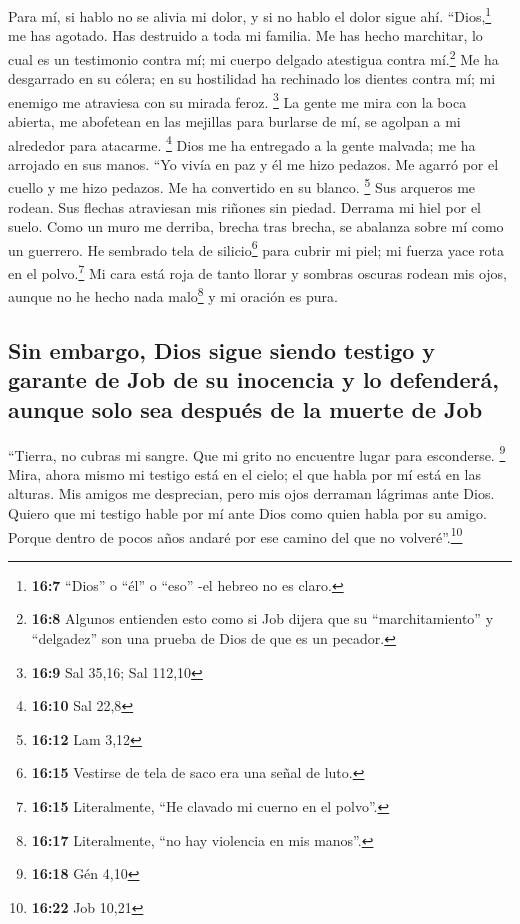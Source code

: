  Para mí, si hablo no se alivia mi dolor, y si no hablo el
dolor sigue ahí.  ``Dios,\footnote{\textbf{16:7} ``Dios''
  o ``él'' o ``eso'' -el hebreo no es claro.} me has agotado. Has
destruido a toda mi familia.  Me has hecho marchitar, lo
cual es un testimonio contra mí; mi cuerpo delgado atestigua contra
mí.\footnote{\textbf{16:8} Algunos entienden esto como si Job dijera que
  su ``marchitamiento'' y ``delgadez'' son una prueba de Dios de que es
  un pecador.}  Me ha desgarrado en su cólera; en su
hostilidad ha rechinado los dientes contra mí; mi enemigo me atraviesa
con su mirada feroz. \footnote{\textbf{16:9} Sal 35,16; Sal 112,10}
 La gente me mira con la boca abierta, me abofetean en
las mejillas para burlarse de mí, se agolpan a mi alrededor para
atacarme. \footnote{\textbf{16:10} Sal 22,8}  Dios me ha
entregado a la gente malvada; me ha arrojado en sus manos.
 ``Yo vivía en paz y él me hizo pedazos. Me agarró por el
cuello y me hizo pedazos. Me ha convertido en su blanco. \footnote{\textbf{16:12}
  Lam 3,12}  Sus arqueros me rodean. Sus flechas
atraviesan mis riñones sin piedad. Derrama mi hiel por el suelo.
 Como un muro me derriba, brecha tras brecha, se abalanza
sobre mí como un guerrero.  He sembrado tela de
silicio\footnote{\textbf{16:15} Vestirse de tela de saco era una señal
  de luto.} para cubrir mi piel; mi fuerza yace rota en el
polvo.\footnote{\textbf{16:15} Literalmente, ``He clavado mi cuerno en
  el polvo''.}  Mi cara está roja de tanto llorar y
sombras oscuras rodean mis ojos,  aunque no he hecho nada
malo\footnote{\textbf{16:17} Literalmente, ``no hay violencia en mis
  manos''.} y mi oración es pura.

\hypertarget{sin-embargo-dios-sigue-siendo-testigo-y-garante-de-job-de-su-inocencia-y-lo-defenderuxe1-aunque-solo-sea-despuuxe9s-de-la-muerte-de-job}{%
\subsection{Sin embargo, Dios sigue siendo testigo y garante de Job de
su inocencia y lo defenderá, aunque solo sea después de la muerte de
Job}\label{sin-embargo-dios-sigue-siendo-testigo-y-garante-de-job-de-su-inocencia-y-lo-defenderuxe1-aunque-solo-sea-despuuxe9s-de-la-muerte-de-job}}

 ``Tierra, no cubras mi sangre. Que mi grito no encuentre
lugar para esconderse. \footnote{\textbf{16:18} Gén 4,10}
 Mira, ahora mismo mi testigo está en el cielo; el que
habla por mí está en las alturas.  Mis amigos me
desprecian, pero mis ojos derraman lágrimas ante Dios. 
Quiero que mi testigo hable por mí ante Dios como quien habla por su
amigo.  Porque dentro de pocos años andaré por ese camino
del que no volveré''.\footnote{\textbf{16:22} Job 10,21}

